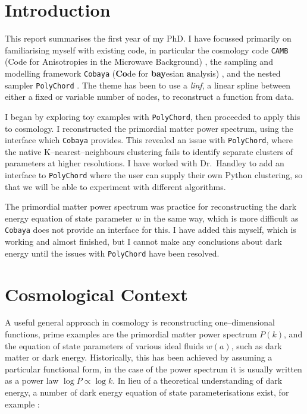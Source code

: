 \documentclass{article}
\begin{document}
\newpage

\tableofcontents

\newpage

\section{Introduction}
This report summarises the first year of my PhD. I have focussed primarily on familiarising myself with existing code, in particular the cosmology code \texttt{CAMB} (Code for Anisotropies in the Microwave Background) \cite{CAMB_1, CAMB_2}, the sampling and modelling framework \texttt{Cobaya} (\textbf{Co}de for \textbf{bay}esian \textbf{a}nalysis) \cite{Cobaya}, and the nested sampler \texttt{PolyChord} \cite{PolyChord_1, PolyChord_2}. The theme has been to use a \textit{linf}, a linear spline between either a fixed or variable number of nodes, to reconstruct a function from data.

I began by exploring toy examples with \texttt{PolyChord}, then proceeded to apply this to cosmology. I reconstructed the primordial matter power spectrum, using the interface which \texttt{Cobaya} provides. This revealed an issue with \texttt{PolyChord}, where the native K--nearest--neighbours clustering fails to identify separate clusters of parameters at higher resolutions. I have worked with Dr.~Handley to add an interface to \texttt{PolyChord} where the user can supply their own Python clustering, so that we will be able to experiment with different algorithms.

The primordial matter power spectrum was practice for reconstructing the dark energy equation of state parameter $w$ in the same way, which is more difficult as \texttt{Cobaya} does not provide an interface for this. I have added this myself, which is working and almost finished, but I cannot make any conclusions about dark energy until the issues with \texttt{PolyChord} have been resolved. 

\section{Cosmological Context}
\label{sec:context}

A useful general approach in cosmology is reconstructing one--dimensional functions, prime examples are the primordial matter power spectrum $P(k)$, and the equation of state parameters of various ideal fluids $w(a)$, such as dark matter or dark energy. Historically, this has been achieved by assuming a particular functional form, in the case of the power spectrum it is usually written as a power law $\log{P} \propto \log{k}$. In lieu of a theoretical understanding of dark energy, a number of dark energy equation of state parameterisations exist, for example \cite{Vazquez_2012}:
\end{document}
